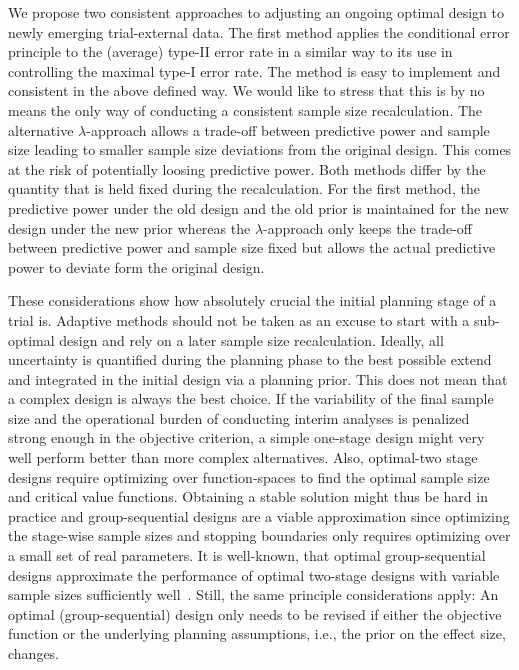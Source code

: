 \documentclass[12pt]{article}
\begin{document}
We propose two consistent approaches to adjusting an ongoing optimal design to
newly emerging trial-external data.
The first method applies the conditional error principle to the (average) type-II error rate in a
similar way to its use in controlling the maximal type-I error rate.
The method is easy to implement and consistent in the above defined way.
We would like to stress that this is by no means the only way of
conducting a consistent sample size recalculation.
The alternative $\lambda$-approach allows a trade-off between predictive power
and sample size leading to smaller sample size deviations from the original design.
This comes at the risk of potentially loosing predictive power.
Both methods differ by the quantity that is held fixed during the recalculation.
For the first method, the predictive power under the old design and the old prior
is maintained for the new design under the new prior whereas the $\lambda$-approach
only keeps the trade-off between predictive power and sample size fixed but allows the
actual predictive power to deviate form the original design.

These considerations show how absolutely crucial the initial planning stage of a trial is.
Adaptive methods should not be taken as an excuse to start with a
sub-optimal design and rely on a later sample size recalculation.
Ideally, all uncertainty is quantified during the planning phase to
the best possible extend and integrated in the initial design via a
planning prior.
This does not mean that a complex design is always the best choice.
If the variability of the final sample size and the operational
burden of conducting interim analyses is penalized strong enough in
the objective criterion, a simple one-stage design might very well
perform better than more complex alternatives.
Also,
optimal-two stage designs require optimizing over function-spaces to find the optimal sample size and critical value functions.
Obtaining a stable solution might thus be hard in practice and
group-sequential designs are a viable approximation since optimizing the stage-wise sample sizes and stopping boundaries only requires optimizing over a small set of real parameters.
It is well-known, that optimal group-sequential designs approximate the performance of optimal two-stage designs with variable sample sizes sufficiently well~\cite{wassmer2016}.
Still, the same principle considerations apply:
An optimal (group-sequential) design only needs to be revised if either the objective function or the underlying planning assumptions, i.e., the prior on the effect size, changes.
\end{document}
